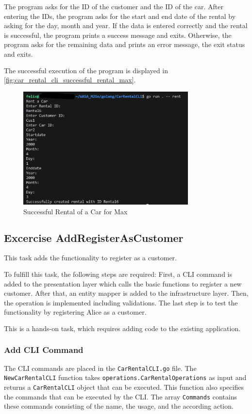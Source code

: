 The program asks for the ID of the customer and the ID of the car.
After entering the IDs, the program asks for the start and end date of the rental by asking for the day, month and year.
If the data is entered correctly and the rental is successful, the program prints a success message and exits.
Otherwise, the program asks for the remaining data and prints an error message, the exit status and exits.

The successful execution of the program is displayed in \autoref{fig:car_rental_cli_successful_rental_max}.

\begin{figure}
      \centering
      \includegraphics[width=0.8\textwidth]{figures/goLang/carRental/carRentalCLI/carRentalCli_SuccessfulRentalMax.png}
      \caption{Successful Rental of a Car for Max}
      \label{fig:car_rental_cli_successful_rental_max}
\end{figure}

\subsection{Excercise AddRegisterAsCustomer}
\label{sec:exercise_add_register_as_customer}
This task adds the functionality to register as a customer.

To fulfill this task, the following steps are required:
First, a CLI command is added to the presentation layer which calls the basic functions to register a new customer.
After that, an entity mapper is added to the infrastructure layer.
Then, the operation is implemented including validations.
The last step is to test the functionality by registering Alice as a customer.

This is a hands-on task, which requires adding code to the existing application.

\subsubsection*{Add CLI Command}
The CLI commands are placed in the \texttt{CarRentalCLI.go} file.
The \texttt{NewCarRentalCLI} function takes \texttt{operations.CarRentalOperations} as input and returns a \texttt{CarRentalCLI} object that can be executed.
This function also specifies the commands that can be executed by the CLI.
The array \texttt{Commands} contains these commands consisting of the name, the usage, and the according action.

